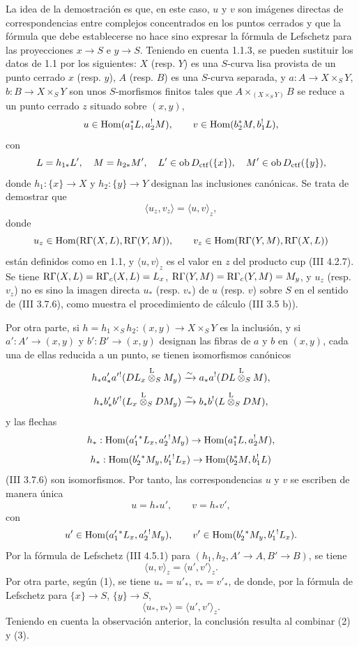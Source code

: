 La idea de la demostración es que, en este caso, $u$ y $v$ son imágenes directas de correspondencias entre complejos concentrados en los puntos cerrados y que la fórmula que debe establecerse no hace sino expresar la fórmula de Lefschetz para las proyecciones $x\to S$ e $y\to S$. Teniendo en cuenta 1.1.3, se pueden sustituir los datos de 1.1 por los siguientes: $X$ (resp. $Y$) es una $S$-curva lisa provista de un punto cerrado $x$ (resp. $y$), $A$ (resp. $B$) es una $S$-curva separada, y $a:A\to X\times_S Y$, $b:B\to X\times_S Y$ son unos $S$-morfismos finitos tales que $A\times_{(X\times_SY)}B$ se reduce a un punto cerrado $z$ situado sobre $(x,y)$,
\[
u\in\operatorname{Hom}(a_1^*L,a_2^!M),\qquad v\in\operatorname{Hom}(b_2^*M,b_1^!L),
\]
con
\[
L=h_{1*}L',\quad M=h_{2*}M',\quad
L'\in\operatorname{ob} D_{\mathrm{ctf}}(\{x\}),\quad M'\in\operatorname{ob} D_{\mathrm{ctf}}(\{y\}),
\]
donde $h_1:\{x\}\to X$ y $h_2:\{y\}\to Y$ designan las inclusiones canónicas. Se trata de demostrar que
\[
\langle u_z,v_z\rangle=\langle u,v\rangle_z,
\]
donde
\[
u_z\in\operatorname{Hom}(\mathrm{R}\Gamma(X,L),\mathrm{R}\Gamma(Y,M)),\qquad
v_z\in\operatorname{Hom}(\mathrm{R}\Gamma(Y,M),\mathrm{R}\Gamma(X,L))
\]
están definidos como en 1.1, y $\langle u,v\rangle_z$ es el valor en $z$ del producto cup (III 4.2.7). Se tiene $\mathrm{R}\Gamma(X,L)=\mathrm{R}\Gamma_c(X,L)=L_x$, $\mathrm{R}\Gamma(Y,M)=\mathrm{R}\Gamma_c(Y,M)=M_y$, y $u_z$ (resp. $v_z$) no es sino la imagen directa $u_*$ (resp. $v_*$) de $u$ (resp. $v$) sobre $S$ en el sentido de (III 3.7.6), como muestra el procedimiento de cálculo (III 3.5 b)).

Por otra parte, si $h=h_1\times_Sh_2:(x,y)\to X\times_SY$ es la inclusión, y si $a':A'\to(x,y)$ y $b':B'\to(x,y)$ designan las fibras de $a$ y $b$ en $(x,y)$, cada una de ellas reducida a un punto, se tienen isomorfismos canónicos
\[
h_*a'_*a'{}^!(DL_x\overset{\mathrm L}{\otimes}_SM_y)
 \xrightarrow{\sim} a_*a^!(DL\overset{\mathrm L}{\otimes}_SM),
\]
\[
h_*b'_*b'{}^!(L_x\overset{\mathrm L}{\otimes}_SDM_y)
 \xrightarrow{\sim} b_*b^!(L\overset{\mathrm L}{\otimes}_SDM),
\]
y las flechas
\[
h_*:\operatorname{Hom}(a_1'{}^*L_x,a_2'{}^!M_y)\to \operatorname{Hom}(a_1^*L,a_2^!M),
\]
\[
h_*:\operatorname{Hom}(b_2'{}^*M_y,b_1'{}^!L_x)\to \operatorname{Hom}(b_2^*M,b_1^!L)
\]
(III 3.7.6) son isomorfismos. Por tanto, las correspondencias $u$ y $v$ se escriben de manera única
\begin{equation}\tag{1}
u=h_*u',\qquad v=h_*v',
\end{equation}
con
\[
u'\in\operatorname{Hom}(a_1'{}^*L_x,a_2'{}^!M_y),\qquad
v'\in\operatorname{Hom}(b_2'{}^*M_y,b_1'{}^!L_x).
\]
Por la fórmula de Lefschetz (III 4.5.1) para $(h_1,h_2,A'\to A,B'\to B)$, se tiene
\begin{equation}\tag{2}
\langle u,v\rangle_z=\langle u',v'\rangle_z .
\end{equation}
Por otra parte, según (1), se tiene $u_*=u'_*$, $v_*=v'_*$, de donde, por la fórmula de Lefschetz para $\{x\}\to S$, $\{y\}\to S$,
\begin{equation}\tag{3}
\langle u_*,v_*\rangle=\langle u',v'\rangle_z .
\end{equation}
Teniendo en cuenta la observación anterior, la conclusión resulta al combinar (2) y (3).
